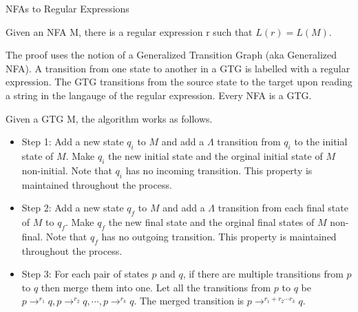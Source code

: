 \documentclass{beamer}
\begin{document}
\begin{frame}[allowframebreaks]{NFAs to Regular Expressions}
\begin{theorem}
Given an NFA M, there is a regular expression r such that $L(r)=L(M)$. 
\end{theorem}

The proof uses the notion of a Generalized Transition Graph (aka Generalized NFA). 
A transition from one state to another in a GTG is labelled with a regular expression. 
The GTG transitions from the source state to the target upon reading a string in 
the langauge of the regular expression. Every NFA is a GTG. 

Given a GTG M, the algorithm works as follows.


\begin{itemize}
  \item Step 1: Add a new state $q_i$ to $M$ and add a $\Lambda$ transition from $q_i$ to the initial state of $M$. 
                Make $q_i$ the new initial state and the orginal initial state of $M$ non-initial. 
                Note that $q_i$ has no incoming transition. This property is maintained throughout the process. 
  \item Step 2: Add a new state $q_f$ to $M$ and add a $\Lambda$ transition from each final state of $M$ to $q_f$. 
  				Make $q_f$ the new final state and the orginal final states of $M$ non-final. 
  				Note that $q_f$ has no outgoing transition. This property is maintained throughout the process.
  \item Step 3: For each pair of states $p$ and $q$, if there are multiple transitions from $p$ to $q$ 
  				then merge them into one. 
  				Let all the transitions from $p$ to $q$ be $p\longrightarrow^{r_1} q, p\longrightarrow^{r_2} q, 
  					\cdots,  p\longrightarrow^{r_k} q$. 
                The merged transition is $p\longrightarrow^{r_1+r_2\cdots r_k} q$.
                

\end{itemize}
\end{frame}
\end{document}
